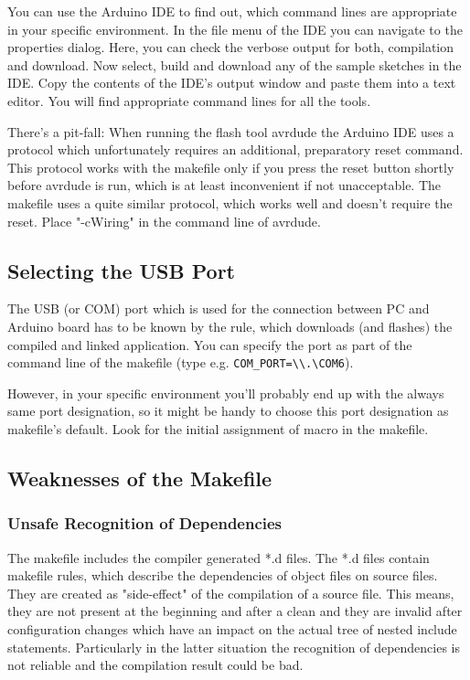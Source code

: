 You can use the Arduino IDE to find out, which command lines are
appropriate in your specific environment. In the file menu of the IDE you
can navigate to the properties dialog. Here, you can check the verbose
output for both, compilation and download. Now select, build and download
any of the sample sketches in the IDE. Copy the contents of the IDE's
output window and paste them into a text editor. You will find appropriate
command lines for all the tools.

There's a pit-fall: When running the flash tool avrdude the Arduino IDE
uses a protocol which unfortunately requires an additional, preparatory
reset command. This protocol works with the makefile only if you press the
reset button shortly before avrdude is run, which is at least inconvenient
if not unacceptable. The makefile uses a quite similar protocol, which
works well and doesn't require the reset. Place "-cWiring" in the command
line of avrdude.


\subsection{Selecting the USB Port}

The USB (or COM) port which is used for the connection between PC and
Arduino board has to be known by the rule, which downloads (and flashes)
the compiled and linked application. You can specify the port as part of
the command line of the makefile (type e.g. \verb+COM_PORT=\\.\COM6+).

However, in your specific environment you'll probably end up with the
always same port designation, so it might be handy to choose this port
designation as makefile's default. Look for the initial assignment of
macro  in the makefile.


\subsection{Weaknesses of the Makefile}

\subsubsection{Unsafe Recognition of Dependencies}

The makefile includes the compiler generated *.d files. The *.d files
contain makefile rules, which describe the dependencies of object files on
source files. They are created as "side-effect" of the compilation of a
source file. This means, they are not present at the beginning and after a
clean and they are invalid after configuration changes which have an
impact on the actual tree of nested include statements. Particularly in
the latter situation the recognition of dependencies is not reliable and
the compilation result could be bad.

